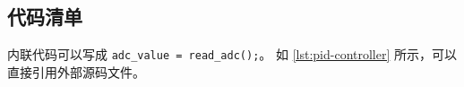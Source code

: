 \subsection{代码清单}
\label{sec:code}

内联代码可以写成 \lstinline|adc_value = read_adc();|。
如 \autoref{lst:pid-controller} 所示，可以直接引用外部源码文件。


